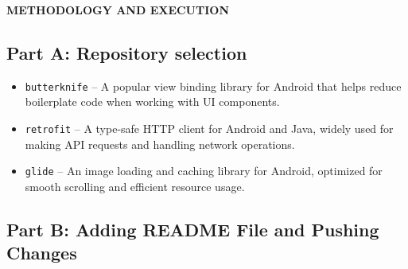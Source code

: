 \documentclass[12pt,a4paper]{article}
\newcommand{\sectionbar}[1]{%
  \vspace{0.6\baselineskip}%
  \noindent
  \colorbox{sectionbar}{%
    \parbox{\dimexpr\linewidth-2\fboxsep\relax}{%
      \textbf{\Large\textsf{#1}}%
    }%
  }%
  \vspace{0.6\baselineskip}
}
\begin{document}
\sectionbar{METHODOLOGY AND EXECUTION}

\subsection*{Part A: Repository selection}
\begin{itemize}
        \item \texttt{butterknife} -- A popular view binding library for Android that helps reduce boilerplate code when working with UI components. 
        \item \texttt{retrofit} -- A type-safe HTTP client for Android and Java, widely used for making API requests and handling network operations.
        \item \texttt{glide} -- An image loading and caching library for Android, optimized for smooth scrolling and efficient resource usage.
    \end{itemize}

\subsection*{Part B: Adding README File and Pushing Changes}
\end{document}
